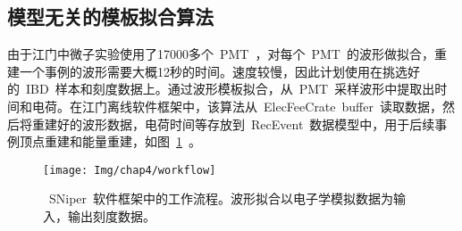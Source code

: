 %
%
%
%
%



\subsection{模型无关的模板拟合算法}
由于江门中微子实验使用了17000多个~PMT~，对每个~PMT~的波形做拟合，重建一个事例的波形需要大概12秒的时间。速度较慢，因此计划使用在挑选好的~IBD~样本和刻度数据上。通过波形模板拟合，从~PMT~采样波形中提取出时间和电荷。在江门离线软件框架中，该算法从~ElecFeeCrate~buffer~读取数据，然后将重建好的波形数据，电荷时间等存放到~RecEvent~数据模型中，用于后续事例顶点重建和能量重建，如图~\ref{fig:workflow}~。
\begin{figure}[!htbp]
  \centering
   \texttt{[image: Img/chap4/workflow]}
    \caption{~SNiper~软件框架中的工作流程。波形拟合以电子学模拟数据为输入，输出刻度数据。}
  \label{fig:workflow}
\end{figure}

